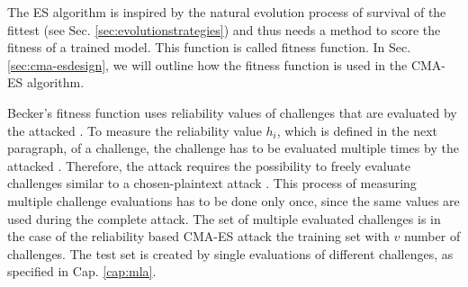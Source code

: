 The \ac{ES} algorithm is inspired by the natural evolution process of survival of the fittest (see Sec. \ref{sec:evolutionstrategies}) and thus needs a method to score the fitness of a trained model.
This function is called fitness function.
In Sec. \ref{sec:cma-esdesign}, we will outline how the fitness function is used in the \ac{CMA-ES} algorithm.


Becker's fitness function uses reliability values of challenges that are evaluated by the attacked \puf.
To measure the reliability value $h_i$, which is defined in the next paragraph, of a challenge, the challenge has to be evaluated multiple times by the attacked \puf.
Therefore, the attack requires the possibility to freely evaluate challenges similar to a chosen-plaintext attack \cite{Wikipedia2016Chosen-plaintextAttack}.
This process of measuring multiple challenge evaluations has to be done only once, since the same values are used during the complete attack. %
The set of multiple evaluated challenges is in the case of the reliability based \ac{CMA-ES} attack the training set with $v$ number of challenges.
The test set is created by single evaluations of different challenges, as specified in Cap. \ref{cap:mla}.




